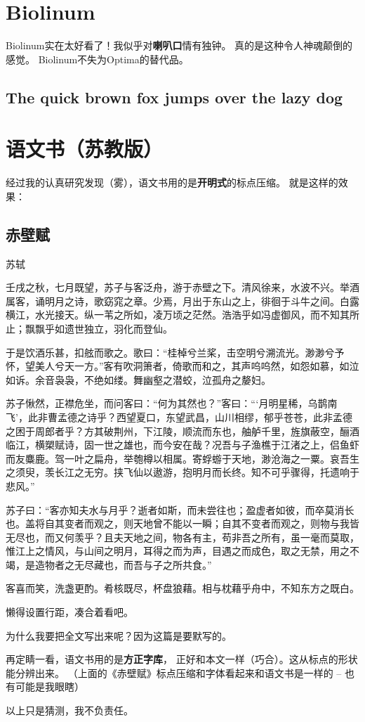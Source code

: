 \documentclass[a5paper, 10pt]{article}
\begin{document}
    \section{Biolinum}{
        Biolinum实在太好看了！我似乎对\textbf{喇叭口}情有独钟。
        真的是这种令人神魂颠倒的感觉。
        Biolinum不失为Optima的替代品。

        \subsection*{The quick brown fox jumps over the lazy dog}{
            \blindtext
        }
    }
    \pagebreak
    \section{语文书（苏教版）}{
        经过我的认真研究发现（雾），语文书用的是\textbf{开明式}的标点压缩。
        就是这样的效果：

        \subsection*{赤壁赋}{
            \kaishu
            苏轼

            \songti
            壬戌之秋，七月既望，苏子与客泛舟，游于赤壁之下。清风徐来，水波不兴。举酒属客，诵明月之诗，歌窈窕之章。少焉，月出于东山之上，徘徊于斗牛之间。白露横江，水光接天。纵一苇之所如，凌万顷之茫然。浩浩乎如冯虚御风，而不知其所止；飘飘乎如遗世独立，羽化而登仙。

            于是饮酒乐甚，扣舷而歌之。歌曰：“桂棹兮兰桨，击空明兮溯流光。渺渺兮予怀，望美人兮天一方。”客有吹洞箫者，倚歌而和之，其声呜呜然，如怨如慕，如泣如诉。余音袅袅，不绝如缕。舞幽壑之潜蛟，泣孤舟之嫠妇。

            苏子愀然，正襟危坐，而问客曰：“何为其然也？”客曰：“‘月明星稀，乌鹊南飞’，此非曹孟德之诗乎？西望夏口，东望武昌，山川相缪，郁乎苍苍，此非孟德之困于周郎者乎？方其破荆州，下江陵，顺流而东也，舳舻千里，旌旗蔽空，酾酒临江，横槊赋诗，固一世之雄也，而今安在哉？况吾与子渔樵于江渚之上，侣鱼虾而友麋鹿。驾一叶之扁舟，举匏樽以相属。寄蜉蝣于天地，渺沧海之一粟。哀吾生之须臾，羡长江之无穷。挟飞仙以遨游，抱明月而长终。知不可乎骤得，托遗响于悲风。”

            苏子曰：“客亦知夫水与月乎？逝者如斯，而未尝往也；盈虚者如彼，而卒莫消长也。盖将自其变者而观之，则天地曾不能以一瞬；自其不变者而观之，则物与我皆无尽也，而又何羡乎？且夫天地之间，物各有主，苟非吾之所有，虽一毫而莫取，惟江上之情风，与山间之明月，耳得之而为声，目遇之而成色，取之无禁，用之不竭，是造物者之无尽藏也，而吾与子之所共食。”

            客喜而笑，洗盏更酌。肴核既尽，杯盘狼藉。相与枕藉乎舟中，不知东方之既白。
        }

        \vspace{5mm}
        懒得设置行距，凑合着看吧。

        为什么我要把全文写出来呢？因为这篇是要默写的。

        再定睛一看，语文书用的是\textbf{方正字库}，
        正好和本文一样（巧合）。这从标点的形状能分辨出来。
        （上面的《赤壁赋》标点压缩和字体看起来和语文书是一样的 --
        也有可能是我眼瞎）
        
        以上只是猜测，我不负责任。
    }
    \pagebreak
\end{document}
